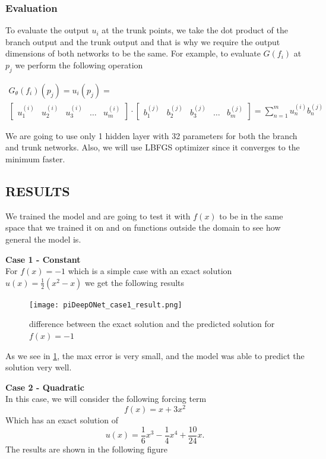 \documentclass[a4paper,12pt]{article}
\theoremstyle{definition}
\begin{document}
\subsubsection{Evaluation}
To evaluate the output $u_i$ at the trunk points,
we take the dot product of the branch output and the trunk output and that is why we require the
output dimensions of both networks to be the same. For example,
to evaluate $G(f_i)$ at $p_j$ we perform the following operation

\begin{multline}
G_{\theta}(f_i)(p_j) = u_i(p_j) = \\ 
\begin{bmatrix}
u^{(i)}_1 & u^{(i)}_2 & u^{(i)}_3 & \dots & u^{(i)}_m
\end{bmatrix} \cdot 
\begin{bmatrix} 
b^{(j)}_1 & b^{(j)}_2 & b^{(j)}_3 & \dots & b^{(j)}_m
\end{bmatrix}
= \sum_{n=1}^{m} u^{(i)}_n b^{(j)}_n
\end{multline}

We are going to use only 1 hidden layer with 32 parameters for both the branch and trunk networks. 
Also, we will use LBFGS optimizer since it converges to the minimum faster.
\subsection{RESULTS}
We trained the model and are going to test it with $f(x)$ to be in the same space that we trained it on
and on functions outside the domain to see how general the model is.

\textbf{Case 1 - Constant}\\
For $f(x) = -1$ which is a simple case with an exact solution $u(x) = \frac{1}{2} (x^2 - x)$ we get the following results 

\begin{figure}[H]
    \centering 
    \texttt{[image: piDeepONet\_case1\_result.png]}
    \label{constant_f}
    \caption[figure1]{difference between the exact solution and the predicted solution for $f(x) = -1$}
\end{figure}

As we see in \ref*{constant_f}, the max error is very small, and the model 
was able to predict the solution very well.

\textbf{Case 2 - Quadratic}\\
In this case, we will consider the following forcing term
\[ f(x) = x + 3x^2 \] 
Which has an exact solution of 
\[u(x) = \dfrac{1}{6} x^3 - \dfrac{1}{4} x^4 + \dfrac{10}{24} x. \] 
The results are shown in the following figure
\end{document}
